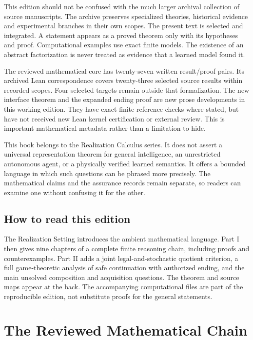 \documentclass[11pt,oneside,openany]{book}
\theoremstyle{definition}\newtheorem{definition}[theorem]{Definition}
\begin{document}
This edition should not be confused with the much larger archival collection of source manuscripts. The archive preserves specialized theories, historical evidence and experimental branches in their own scopes. The present text is selected and integrated. A statement appears as a proved theorem only with its hypotheses and proof. Computational examples use exact finite models. The existence of an abstract factorization is never treated as evidence that a learned model found it.

The reviewed mathematical core has twenty-seven written result/proof pairs. Its archived Lean correspondence covers twenty-three selected source results within recorded scopes. Four selected targets remain outside that formalization. The new interface theorem and the expanded ending proof are new prose developments in this working edition. They have exact finite reference checks where stated, but have not received new Lean kernel certification or external review. This is important mathematical metadata rather than a limitation to hide.

This book belongs to the Realization Calculus series. It does not assert a universal representation theorem for general intelligence, an unrestricted autonomous agent, or a physically verified learned semantics. It offers a bounded language in which such questions can be phrased more precisely. The mathematical claims and the assurance records remain separate, so readers can examine one without confusing it for the other.

\chapter*{How to read this edition}
The Realization Setting introduces the ambient mathematical language. Part I then gives nine chapters of a complete finite reasoning chain, including proofs and counterexamples. Part II adds a joint legal-and-stochastic quotient criterion, a full game-theoretic analysis of safe continuation with authorized ending, and the main unsolved composition and acquisition questions. The theorem and source maps appear at the back. The accompanying computational files are part of the reproducible edition, not substitute proofs for the general statements.

\tableofcontents

\mainmatter
\part{The Reviewed Mathematical Chain}

\end{document}
